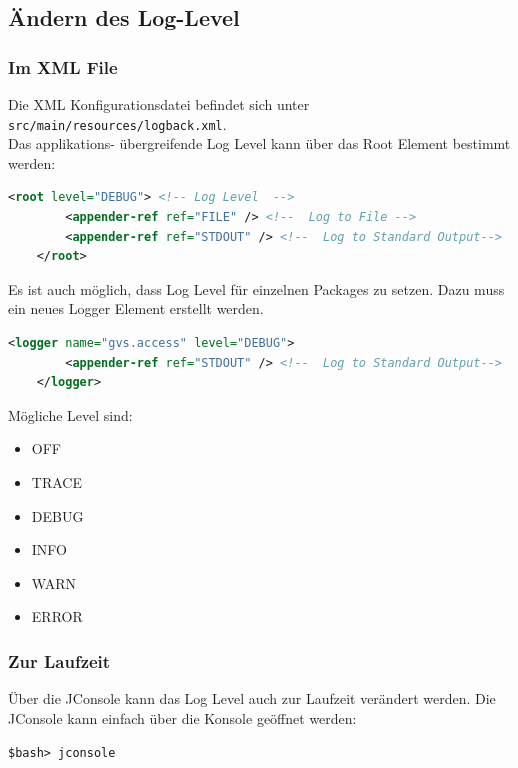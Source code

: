 \documentclass[11pt,a4paper,english,oneside]{book}
\numberwithin{equation}{chapter}
\begin{document}
	\subsection{Ändern des Log-Level} \label{ssec:logger}
	
	\subsubsection{Im XML File}
	Die XML Konfigurationsdatei befindet sich unter \lstinline|src/main/resources/logback.xml|. \\
	Das applikations- übergreifende Log Level kann über das Root Element bestimmt werden:
	
	\begin{lstlisting}[language=xml, frame=single, caption={Root Log Level verändern}, label={lst:root-log-level}]
	<root level="DEBUG"> <!-- Log Level  -->
		<appender-ref ref="FILE" /> <!--  Log to File -->
		<appender-ref ref="STDOUT" /> <!--  Log to Standard Output-->
	</root>
	\end{lstlisting}

	\noindent
	Es ist auch möglich, dass Log Level für einzelnen Packages zu setzen. Dazu muss ein neues Logger Element erstellt werden.
	
	\begin{lstlisting}[language=xml, frame=single, caption={Package Log Level verändern}, label={lst:log-level}]
	<logger name="gvs.access" level="DEBUG">
		<appender-ref ref="STDOUT" /> <!--  Log to Standard Output-->
	</logger>
	\end{lstlisting}	
	
	\noindent
	Mögliche Level sind:
	\begin{itemize}
		\item OFF
		\item TRACE
		\item DEBUG
		\item INFO
		\item WARN
		\item ERROR
	\end{itemize}

	\subsubsection{Zur Laufzeit}
	Über die JConsole kann das Log Level auch zur Laufzeit verändert werden. Die JConsole kann einfach über die Konsole geöffnet werden: 
	
	\lstinline|$bash> jconsole|
\end{document}
